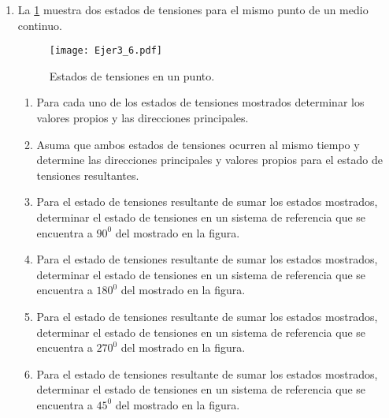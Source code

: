 \documentclass[../notas medios.tex]{subfiles}
\begin{document}
\begin{enumerate}
\item \label{punto06} La \cref{direcc} muestra dos estados de tensiones
para el mismo punto de un medio continuo. 
%
\begin{figure}[H]
	\centering
	\texttt{[image: Ejer3\_6.pdf]}
	\caption{Estados de tensiones en un punto.}
	\label{direcc}
\end{figure}
%
\begin{enumerate}
	\item Para cada uno de los estados de tensiones mostrados determinar los
valores propios y las direcciones principales.
	\item Asuma que ambos estados de tensiones ocurren al mismo tiempo y determine
las direcciones principales y valores propios para el estado de tensiones resultantes.
	\item Para el estado de tensiones resultante de sumar los estados mostrados,
determinar el estado de tensiones en un sistema de referencia que se encuentra a $90^0$ del mostrado en la figura.
	\item Para el estado de tensiones resultante de sumar los estados mostrados,
determinar el estado de tensiones en un sistema de referencia que se encuentra a $180^0$ del mostrado en la figura.
	\item Para el estado de tensiones resultante de sumar los estados mostrados,
determinar el estado de tensiones en un sistema de referencia que se encuentra a $270^0$ del mostrado en la figura.
	\item Para el estado de tensiones resultante de sumar los estados mostrados,
determinar el estado de tensiones en un sistema de referencia que se encuentra a $45^0$ del mostrado en la figura.
\end{enumerate}
%


\end{enumerate}
\end{document}

